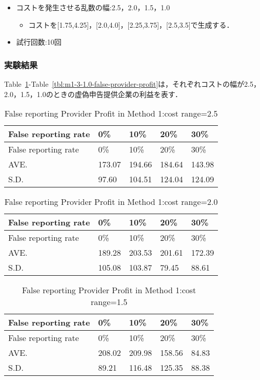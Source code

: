 \begin{itemize}
\tightlist
\item
  コストを発生させる乱数の幅:2.5，2.0，1.5，1.0

  \begin{itemize}
  \tightlist
  \item
    コストを{[}1.75,4.25{]}，{[}2.0,4.0{]}，{[}2.25,3.75{]}，{[}2.5,3.5{]}で生成する．
  \end{itemize}
\item
  試行回数:10回
\end{itemize}

\hypertarget{ux5b9fux9a13ux7d50ux679c-1}{%
\subsubsection{実験結果}\label{ux5b9fux9a13ux7d50ux679c-1}}

Table~\ref{tbl:m1-3-2.5-false-provider-profit}-Table~\ref{tbl:m1-3-1.0-false-provider-profit}は，それぞれコストの幅が2.5，2.0，1.5，1.0のときの虚偽申告提供企業の利益を表す．

\hypertarget{tbl:m1-3-2.5-false-provider-profit}{}
\begin{longtable}[H]{@{}lllll@{}}
\caption{\label{tbl:m1-3-2.5-false-provider-profit}False reporting
Provider Profit in Method 1:cost range=2.5}\tabularnewline
\toprule
False reporting rate & 0\% & 10\% & 20\% & 30\%\tabularnewline
\midrule
\endfirsthead
\toprule
False reporting rate & 0\% & 10\% & 20\% & 30\%\tabularnewline
\midrule
\endhead
AVE. & 173.07 & 194.66 & 184.64 & 143.98\tabularnewline
S.D. & 97.60 & 104.51 & 124.04 & 124.09\tabularnewline
\bottomrule
\end{longtable}

\hypertarget{tbl:m1-3-2.0-false-provider-profit}{}
\begin{longtable}[H]{@{}lllll@{}}
\caption{\label{tbl:m1-3-2.0-false-provider-profit}False reporting
Provider Profit in Method 1:cost range=2.0}\tabularnewline
\toprule
False reporting rate & 0\% & 10\% & 20\% & 30\%\tabularnewline
\midrule
\endfirsthead
\toprule
False reporting rate & 0\% & 10\% & 20\% & 30\%\tabularnewline
\midrule
\endhead
AVE. & 189.28 & 203.53 & 201.61 & 172.39\tabularnewline
S.D. & 105.08 & 103.87 & 79.45 & 88.61\tabularnewline
\bottomrule
\end{longtable}

\hypertarget{tbl:m1-3-1.5-false-provider-profit}{}
\begin{longtable}[H]{@{}lllll@{}}
\caption{\label{tbl:m1-3-1.5-false-provider-profit}False reporting
Provider Profit in Method 1:cost range=1.5}\tabularnewline
\toprule
False reporting rate & 0\% & 10\% & 20\% & 30\%\tabularnewline
\midrule
\endfirsthead
\toprule
False reporting rate & 0\% & 10\% & 20\% & 30\%\tabularnewline
\midrule
\endhead
AVE. & 208.02 & 209.98 & 158.56 & 84.83\tabularnewline
S.D. & 89.21 & 116.48 & 125.35 & 88.38\tabularnewline
\bottomrule
\end{longtable}

